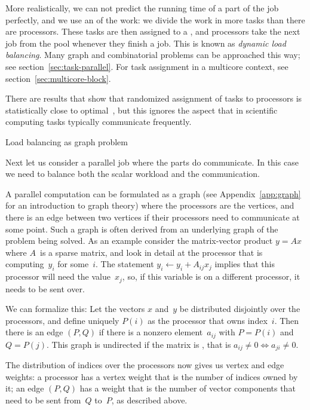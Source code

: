 More realistically, we can not predict the running time of a part of
the job perfectly, and we use an  of the
work: we divide the work in more tasks than there are
processors. These tasks are then assigned to a ,
and processors take the next job from the pool whenever they finish a
job. This is known as \emph{dynamic load
  balancing}. Many graph and
combinatorial problems can be approached this way; see
section~\ref{sec:task-parallel}. For task assignment in a multicore
context, see section~\ref{sec:multicore-block}.

There are results that show that randomized assignment of tasks to
processors is statistically close to optimal~\cite{KarpZhang88}, but
this ignores the aspect that in scientific computing tasks typically
communicate frequently.

 {Load balancing as graph problem}
\label{sec:graph-loadbalancing}

Next let us consider a parallel job where the parts do communicate. In
this case we need to balance both the scalar workload and the
communication.

A parallel computation can be formulated as a graph (see
Appendix~\ref{app:graph} for an introduction to graph theory) where the
processors are the vertices, and there is an edge between two vertices
if their processors need to communicate at some point. Such a graph is
often derived from an underlying graph of the problem being solved.
As an example consider the matrix-vector product $y=Ax$ where
$A$~is a sparse matrix, and look in detail at the processor that is
computing~$y_i$ for some~$i$. The statement $y_i\leftarrow y_i+A_{ij}x_j$
implies that this processor will need the value~$x_j$, so, if this
variable is on a different processor, it needs to be sent over.

We can formalize this: Let the vectors $x$ and~$y$ be distributed
disjointly over the processors, and define uniquely $P(i)$ as the
processor that owns index~$i$. Then there is an edge $(P,Q)$ if there
is a nonzero element~$a_{ij}$ with $P=P(i)$ and $Q=P(j)$. This graph
is undirected if the matrix is ,
that is $a_{ij}\not=0\Leftrightarrow a_{ji}\not=0$.

The distribution of indices over the processors now gives us vertex
and edge weights: a processor has a vertex weight that is the number
of indices owned by it; an edge $(P,Q)$ has a weight that is the number of
vector components that need to be sent from~$Q$ to~$P$, as described above.

